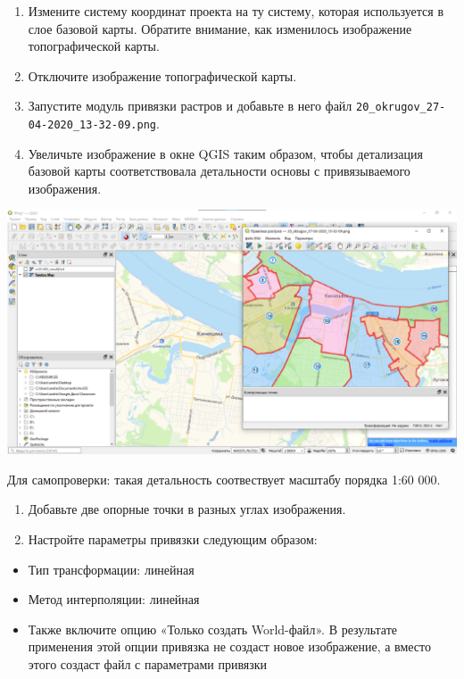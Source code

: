 \documentclass[
  12pt,
]{book}
\providecommand{\tightlist}{%
  \setlength{\itemsep}{0pt}\setlength{\parskip}{0pt}}
\begin{document}
\begin{enumerate}
\def\labelenumi{\arabic{enumi}.}
\setcounter{enumi}{4}
\item
  Измените систему координат проекта на ту систему, которая используется в слое базовой карты. Обратите внимание, как изменилось изображение топографической карты.
\item
  Отключите изображение топографической карты.
\item
  Запустите модуль привязки растров и добавьте в него файл \texttt{20\_okrugov\_27-04-2020\_13-32-09.png}.
\item
  Увеличьте изображение в окне QGIS таким образом, чтобы детализация базовой карты соответствовала детальности основы с привязываемого изображения.
\end{enumerate}

\includegraphics{images/Ex05_Reference/RasterReference9.png}

Для самопроверки: такая детальность соотвествует масштабу порядка 1:60 000.

\begin{enumerate}
\def\labelenumi{\arabic{enumi}.}
\setcounter{enumi}{8}
\item
  Добавьте две опорные точки в разных углах изображения.
\item
  Настройте параметры привязки следующим образом:
\end{enumerate}

\begin{itemize}
\tightlist
\item
  Тип трансформации: линейная
\item
  Метод интерполяции: линейная
\item
  Также включите опцию «Только создать World-файл». В результате применения этой опции привязка не создаст новое изображение, а вместо этого создаст файл с параметрами привязки
\end{itemize}
\end{document}
